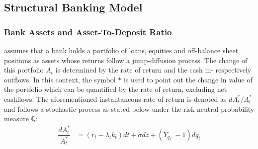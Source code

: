 \subsection{Structural Banking Model}
\subsubsection*{Bank Assets and Asset-To-Deposit Ratio}
\citet{pennacchi2010structural} assumes that a bank holds a portfolio of loans, equities and off-balance sheet positions as assets whose returns follow a jump-diffusion process. The change of this portfolio $A_t$ is determined by the rate of return and the cash in- respectively outflows. In this context, the symbol $*$ is used to point out the change in value of the portfolio which can be quantified by the rate of return, excluding net cashflows. The aforementioned instantaneous rate of return is denoted as $d A_t^*/ A_t^*$ and follows a stochastic process as stated below under the risk-neutral probability measure $\mathbb{Q}$:
\begin{align} \label{bankassetprocess}
\dfrac{d A_t^*}{A_t^*} &= \left( r_t - \lambda_t k_t \right) dt + \sigma dz + \left( Y_{q_{t^{-}}} -1\right) dq_t
\end{align}

